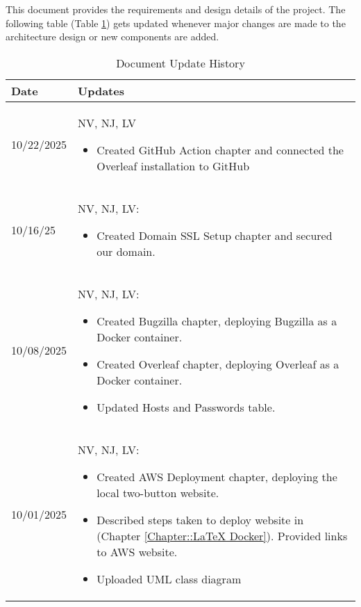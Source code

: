 This document provides the requirements and design details of the
project.  The following table (Table \ref{Table::UpdateHistory}) gets
updated whenever major changes are made to the architecture
design or new components are added.

\begin{longtable}{|l||p{13.5cm}|}
\caption{Document Update History \label{Table::UpdateHistory}}\\
\hline
\textbf{Date} & \textbf{Updates} \\
\hline 
\endhead

10/22/2025 & NV, NJ, LV
\begin{itemize}[topsep=0pt, itemsep=0pt, parsep=0pt, partopsep=0pt, leftmargin=12pt]
    \item Created GitHub Action chapter and connected the Overleaf installation to GitHub
\end{itemize}
\\ \hline

10/16/25 & NV, NJ, LV:
\begin{itemize}[topsep=0pt, itemsep=0pt, parsep=0pt, partopsep=0pt, leftmargin=12pt]
    \item Created Domain SSL Setup chapter and secured our domain.
\end{itemize}
\\ \hline

10/08/2025 & NV, NJ, LV:
\begin{itemize}[topsep=0pt, itemsep=0pt, parsep=0pt, partopsep=0pt, leftmargin=12pt]
    \item Created Bugzilla chapter, deploying Bugzilla as a Docker container.
    \item Created Overleaf chapter, deploying Overleaf as a Docker container.
    \item Updated Hosts and Passwords table.
\end{itemize}
\\ \hline

10/01/2025 & NV, NJ, LV:
\begin{itemize}[topsep=0pt,itemsep=0pt,parsep=0pt,partopsep=0pt,leftmargin=12pt]
    \item Created AWS Deployment chapter, deploying the local two-button website.
    \item Described steps taken to deploy website in (Chapter \ref{Chapter::LaTeX Docker}). Provided links to AWS website.
    \item Uploaded UML class diagram
\end{itemize}
\\ \hline


\end{longtable}
